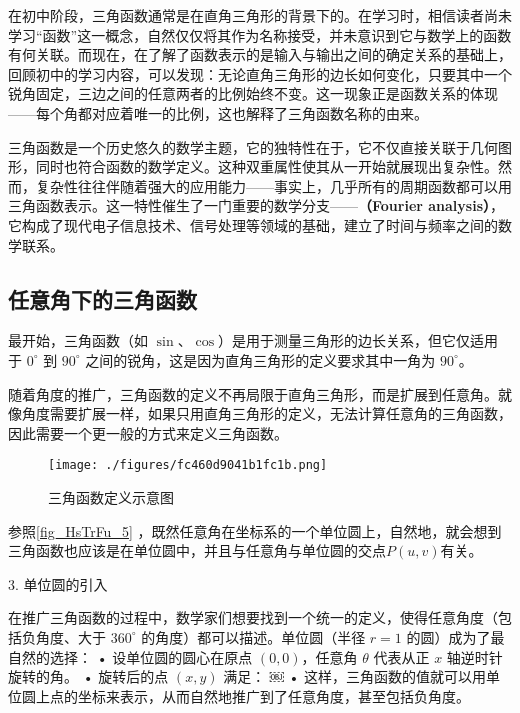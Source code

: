 \begin{issues}
\issueDraft
\end{issues}

在初中阶段，三角函数通常是在直角三角形的背景下的。在学习时，相信读者尚未学习“函数”这一概念，自然仅仅将其作为名称接受，并未意识到它与数学上的函数有何关联。而现在，在了解了函数表示的是输入与输出之间的确定关系的基础上，回顾初中的学习内容，可以发现：无论直角三角形的边长如何变化，只要其中一个锐角固定，三边之间的任意两者的比例始终不变。这一现象正是函数关系的体现——每个角都对应着唯一的比例，这也解释了三角函数名称的由来。

三角函数是一个历史悠久的数学主题，它的独特性在于，它不仅直接关联于几何图形，同时也符合函数的数学定义。这种双重属性使其从一开始就展现出复杂性。然而，复杂性往往伴随着强大的应用能力——事实上，几乎所有的周期函数都可以用三角函数表示。这一特性催生了一门重要的数学分支——\textbf{（Fourier analysis）}，它构成了现代电子信息技术、信号处理等领域的基础，建立了时间与频率之间的数学联系。



\subsection{任意角下的三角函数}

最开始，三角函数（如 $\sin$、$\cos$）是用于测量三角形的边长关系，但它仅适用于 $0^\circ$ 到 $90^\circ$ 之间的锐角，这是因为直角三角形的定义要求其中一角为 $90^\circ$。

随着角度的推广，三角函数的定义不再局限于直角三角形，而是扩展到任意角。就像角度需要扩展一样，如果只用直角三角形的定义，无法计算任意角的三角函数，因此需要一个更一般的方式来定义三角函数。

\begin{figure}[ht]
\centering
\texttt{[image: ./figures/fc460d9041b1fc1b.png]}
\caption{三角函数定义示意图} \label{fig_HsTrFu_5}
\end{figure}

参照\autoref{fig_HsTrFu_5} ，既然任意角在坐标系的一个单位圆上，自然地，就会想到三角函数也应该是在单位圆中，并且与任意角与单位圆的交点$P(u,v)$有关。

3. 单位圆的引入

在推广三角函数的过程中，数学家们想要找到一个统一的定义，使得任意角度（包括负角度、大于 $360^\circ$ 的角度）都可以描述。单位圆（半径 $r = 1$ 的圆）成为了最自然的选择：
	•	设单位圆的圆心在原点 $(0,0)$，任意角 $\theta$ 代表从正 $x$ 轴逆时针旋转的角。
	•	旋转后的点 $(x, y)$ 满足：
￼
	•	这样，三角函数的值就可以用单位圆上点的坐标来表示，从而自然地推广到了任意角度，甚至包括负角度。

